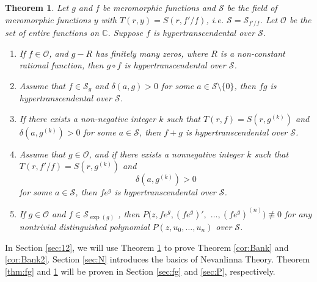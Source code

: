 \documentclass[reqno,12pt]{amsart}
\newtheorem{thm}{Theorem}
\begin{document}
 
 \begin{thm}\label{thm:h} 
Let $g$ and $f$ be meromorphic functions and $\mathcal{S}$ be the field of meromorphic functions $y$ with $T(r, y)=S(r, f'/f)$, i.e. $\mathcal{S}=\mathcal{S}_{f'/f}$. Let $\mathcal{O}$ be the set of entire functions on $\mathbb{C}$. Suppose $f$ is hypertranscendental over $\mathcal{S}$. 
\begin{enumerate}[(1)]

\item\label{t1} If $f\in\mathcal{O}$, and $g-R$ has finitely many zeros, where $R$ is a non-constant rational function, then $g\circ f$ is  hypertranscendental over $\mathcal{S}$.

\item\label{t2} Assume that  $f\in\mathcal{S}_g$ and $\delta(a, g)>0
$ for some $a\in\mathcal{S}\setminus\{0\}$, then $fg$ is hypertranscendental over $\mathcal{S}$. 
 
\item\label{t2.1} If there exists a non-negative integer $k$ such that $T(r, f)=S(r, g^{(k)})$ and $\delta(a, g^{(k)})>0$
for some $a\in\mathcal{S}$, then $f+g$ is hypertranscendental over $\mathcal{S}$. 

\item\label{t3} Assume that $g\in\mathcal{O}$, and if there exists a nonnegative integer $k$ such that $T(r, f'/f)=S(r, g^{(k)})$ and \begin{equation}\label{eqn:ng}
\delta(a, g^{(k)})>0
\end{equation} for some $a\in\mathcal{S}$, then $fe^g$ is  hypertranscendental over $\mathcal{S}$.
\item\label{t4} If $g\in\mathcal{O}$ and $f\in\mathcal{S}_{\exp(g)}$ , then $P(z, fe^g, (fe^g)', $ $\dots, (fe^g)^{(n)})\not\equiv 0$ for any nontrivial distinguished polynomial $P(z, u_0, \dots, u_n)$ over $\mathcal{S}$.

\end{enumerate}

\end{thm}

In Section \ref{sec:12}, we will use Theorem \ref{thm:h} to prove Theorem \ref{cor:Bank} and \ref{cor:Bank2}. Section \ref{sec:N} introduces the basics of Nevanlinna Theory. Theorem \ref{thm:fg} and \ref{thm:h} will be proven in Section \ref{sec:fg} and \ref{sec:P}, respectively.
\end{document}
